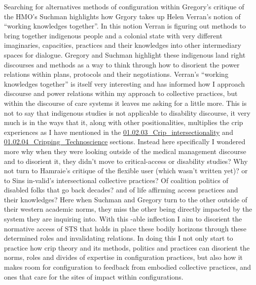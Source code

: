 Searching for alternatives methods of configuration within Gregory's
critique of the HMO's Suchman highlights how Grgory takes up Helen
Verran's notion of ``working knowledges together''. In this notion
Verran is figuring out methods to bring together indigenous people and a
colonial state with very different imaginaries, capacities, practices
and their knowledges into other intermediary spaces for dialogue.
Gregory and Suchman highlight these indigenous land right discourses and
methods as a way to think through how to disorient the power relations
within plans, protocols and their negotiations. Verran's ``working
knowledges together'' is itself very interesting and has informed how I
approach discourse and power relations within my approach to collective
practices, but within the discourse of care systems it leaves me asking
for a little more. This is not to say that indigenous studies is not
applicable to disability discourse, it very much is in the ways that it,
along with other positionalities, multiplies the crip experiences as I
have mentioned in the
\href{../../01_Disability_justice_and_life_affirmation_flipping_the_table/sections/01.02.03_Crip_intersectionality.md}{01.02.03\_Crip\_intersectionality}
and
\href{../../01_Disability_justice_and_life_affirmation_flipping_the_table/sections/01.02.04_Cripping_Technoscience.md}{01.02.04\_Cripping\_Technoscience}
sections. Instead here specifically I wondered more why when they were
looking outside of the medical management discourse and to disorient it,
they didn't move to critical-access or disability studies? Why not turn
to Hamraie's critique of the flexible user (which wasn't written yet)?
or to Sins in-valid's intersectional collective practices? Of coalition
politics of disabled folks that go back decades? and of life affirming
access practices and their knowledges? Here when Suchman and Gregory
turn to the other outside of their western academic norms, they miss the
other being directly impacted by the system they are inquiring into.
With this -able inflection I aim to disorient the normative access of
STS that holds in place these bodily horizons through these determined
roles and invalidating relations. In doing this I not only start to
practice how crip theory and its methods, politics and practices can
disorient the norms, roles and divides of expertise in configuration
practices, but also how it makes room for configuration to feedback from
embodied collective practices, and ones that care for the sites of
impact within configurations.

